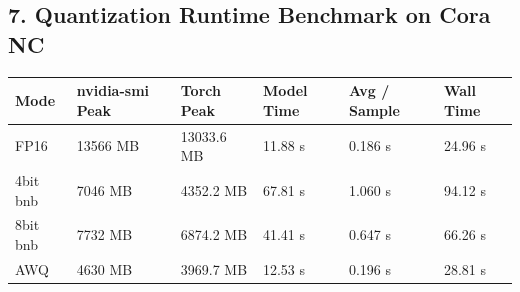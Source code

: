\subsection*{7. Quantization Runtime Benchmark on Cora NC}

\begin{tabular}{llllll}
\toprule
Mode & nvidia-smi Peak & Torch Peak & Model Time & Avg / Sample & Wall Time \\
\midrule
FP16 & 13566 MB & 13033.6 MB & 11.88 s & 0.186 s & 24.96 s \\
4bit bnb & 7046 MB & 4352.2 MB & 67.81 s & 1.060 s & 94.12 s \\
8bit bnb & 7732 MB & 6874.2 MB & 41.41 s & 0.647 s & 66.26 s \\
AWQ & 4630 MB & 3969.7 MB & 12.53 s & 0.196 s & 28.81 s \\
\bottomrule
\end{tabular}

